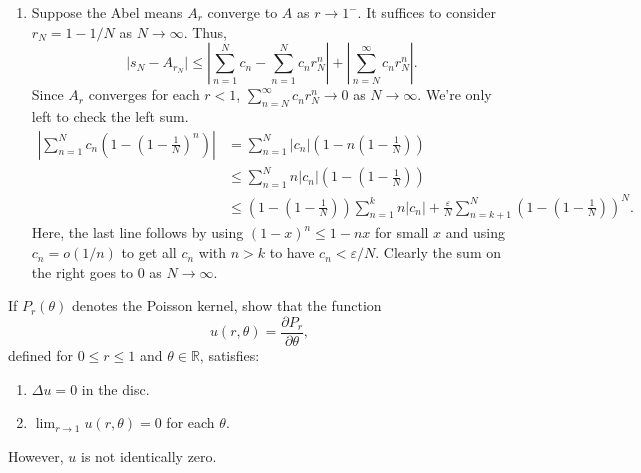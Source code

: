 \documentclass[12 pt, letterpaper]{hmcpset}
\begin{document}
\begin{solution}
\begin{enumerate}
		\item Suppose the Abel means $A_{r}$ converge to  $A$ as $r \to 1^{-}$. It suffices to consider $r_{N} = 1 - 1/N$ as $N \to \infty$. Thus,
			\[
				\lvert s_{N} - A_{r_{N}} \rvert \le \left \lvert \sum_{n = 1}^{N} c_{n} - \sum_{n = 1}^{N} c_{n} r_{N}^{n} \right \rvert + \left \lvert \sum_{n = N}^{\infty} c_{n} r_{N}^{n} \right \rvert.
			\]
			Since $A_{r}$ converges for each $r < 1$, $\sum_{n = N}^{\infty} c_{n} r_{N}^{n} \to 0$ as $N \to \infty$. We're only left to check the left sum.
			\begin{align*}
				\left \lvert \sum_{n = 1}^{N} c_{n} \left ( 1 - \left ( 1 - \frac{1}{N} \right )^{n} \right ) \right \rvert & = \sum_{n = 1}^{N} \lvert c_{n} \rvert \left ( 1 - n \left ( 1 - \frac{1}{N} \right ) \right ) \\
																	    & \le \sum_{n = 1}^{N} n \lvert c_{n} \rvert \left ( 1 - \left ( 1 - \frac{1}{N} \right ) \right ) \\
																	    & \le \left ( 1 - \left ( 1 - \frac{1}{N} \right ) \right ) \sum_{n = 1}^{k} n \lvert c_{n} \rvert + \frac{\varepsilon}{N} \sum_{n = k + 1}^{N} \left ( 1 - \left ( 1 - \frac{1}{N} \right ) \right )^{N}.
			\end{align*}
			Here, the last line follows by using $(1 - x)^{n} \le 1 - n x$ for small $x$ and using  $c_{n} = o(1 / n)$ to get all $c_{n}$ with $n > k$ to have $c_{n} < \varepsilon / N$. Clearly the sum on the right goes to $0$ as $N \to \infty$.
	\end{enumerate}
\end{solution}

\pagebreak

\begin{problem}[S \& S \S 2.6 \#18.]
	If $P_{r}(\theta)$ denotes the Poisson kernel, show that the function
	\[
		u(r, \theta) = \frac{\partial P_{r}}{\partial \theta},
	\]
	defined for $0 \le r \le 1$ and $\theta \in \mathbb{R}$, satisfies:
	\begin{enumerate}[label = (\roman*)]
		\item $\Delta u = 0$ in the disc.
		\item $\lim_{r \to 1} u(r, \theta) = 0$ for each $\theta$.
	\end{enumerate}
	However, $u$ is not identically zero.
\end{problem}
\end{document}

